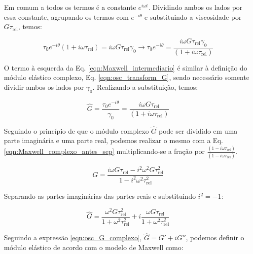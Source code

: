 			Em comum a todos os termos é a constante \(e^{i\omega t}\). Dividindo ambos os lados por essa constante, agrupando os termos com \(e^{-i\theta}\) e substituindo a viscosidade por \(G\tau_{\mathrm{rel}}\), temos:
			
			\begin{equation}
				\tau_0e^{-i\theta} \left(   1 + i\omega\tau_{\textrm{rel}}  \right) = i\omega G\tau_{\textrm{rel}}\gamma_0 \to
				\tau_0e^{-i\theta} = \dfrac{i\omega G\tau_{\textrm{rel}}\gamma_0}{\left(   1 + i\omega\tau_{\textrm{rel}}  \right)}
				\label{eqn:Maxwell_intermediario}
			\end{equation}
			
			O termo à esquerda da Eq. \ref{eqn:Maxwell_intermediario} é similar à definição do módulo elástico complexo, Eq. \ref{eqn:osc_transform_G}, sendo necessário somente dividir ambos os lados por \(\gamma_0\). Realizando a substituição, temos:
			
			\begin{equation}
				\hat{G} = \dfrac{\tau_0e^{-i\theta}}{\gamma_0} = \dfrac{i\omega G\tau_{\textrm{rel}}}{\left(   1 + i\omega\tau_{\textrm{rel}}  \right)}
				\label{eqn:Maxwell_complexo_antes_sep}
			\end{equation}
			
			Seguindo o princípio de que o módulo complexo \(\hat{G}\) pode ser dividido em uma parte imaginária e uma parte real, podemos realizar o mesmo com a Eq. \ref{eqn:Maxwell_complexo_antes_sep} multiplicando-se a fração por \(\frac{\left(   1 - i\omega\tau_{\mathrm{rel}}  \right)}{\left(   1 - i\omega\tau_{\mathrm{rel}}  \right)}\).
			
			\begin{equation}
				\hat{G} = \dfrac{  i\omega G\tau_{\textrm{rel}} - i^2 \omega^2 G \tau_{\textrm{rel}}^2        }{  1 - i^2\omega^2 \tau_{\textrm{rel}}^2          }
				\label{eqn:Maxwell_complexo_antes_sep2}
			\end{equation}
			
			Separando as partes imaginárias das partes reais e substituindo \(i^2 = -1\):
			
			\begin{equation}
				\hat{G} = \dfrac{   \omega^2 G \tau_{\textrm{rel}}^2       }{  1 + \omega^2 \tau_{\textrm{rel}}^2      } + i \dfrac{   \omega G \tau_{\textrm{rel}}        }{ 1 + \omega^2 \tau_{\textrm{rel}}^2 }
				\label{eqn:Maxwell_substituido}
			\end{equation}
			
			Seguindo a expressão \ref{eqn:osc_G_complexo}, \(\hat{G} = G' + iG''\), podemos definir o módulo elástico de acordo com o modelo de Maxwell como:
			
